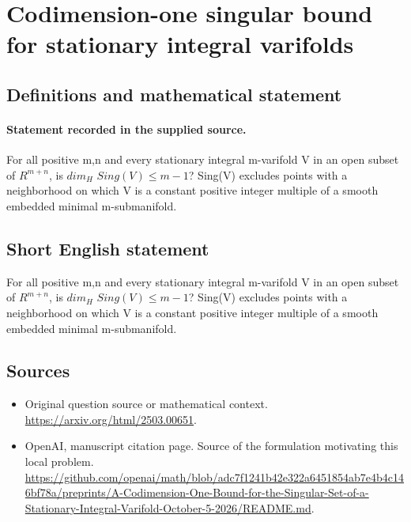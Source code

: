 \documentclass[11pt]{article}
\begin{document}
\section*{Codimension-one singular bound for stationary integral varifolds}\label{30007161}
\subsection{Definitions and mathematical statement}
\paragraph{Statement recorded in the supplied source.}
For all positive m,n and every stationary integral m-varifold V in an open subset of $R^{m+n}$, is $dim_H$ $Sing(V)\leq m-1$? Sing(V) excludes points with a neighborhood on which V is a constant positive integer multiple of a smooth embedded minimal m-submanifold.
\subsection{Short English statement}
For all positive m,n and every stationary integral m-varifold V in an open subset of $R^{m+n}$, is $dim_H$ $Sing(V)\leq m-1$? Sing(V) excludes points with a neighborhood on which V is a constant positive integer multiple of a smooth embedded minimal m-submanifold.
\subsection{Sources}
\begin{itemize}
\item[S1] Original question source or mathematical context.
\url{https://arxiv.org/html/2503.00651}.
\item[S2] OpenAI, manuscript citation page. Source of the formulation motivating this local problem.
\url{https://github.com/openai/math/blob/adc7f1241b42e322a6451854ab7e4b4c146bf78a/preprints/A-Codimension-One-Bound-for-the-Singular-Set-of-a-Stationary-Integral-Varifold-October-5-2026/README.md}.
\end{itemize}
\end{document}

